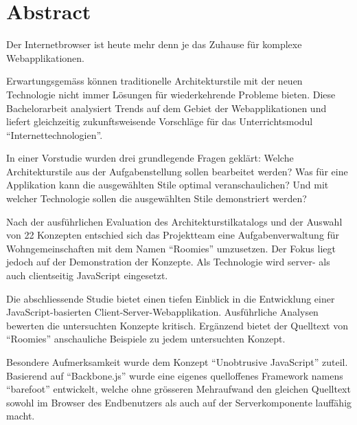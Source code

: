 \clearpage
\thispagestyle{empty}

\section*{Abstract}

Der Internetbrowser ist heute mehr denn je das Zuhause für komplexe Webapplikationen.

Erwartungsgemäss können traditionelle Architekturstile mit der neuen Technologie nicht immer Lösungen für wiederkehrende Probleme bieten. Diese Bachelorarbeit analysiert Trends auf dem Gebiet der Webapplikationen und liefert gleichzeitig zukunftsweisende Vorschläge für das Unterrichtsmodul ``Internettechnologien''.

In einer Vorstudie wurden drei grundlegende Fragen geklärt: Welche Architekturstile aus der Aufgabenstellung sollen bearbeitet werden? Was für eine Applikation kann die ausgewählten Stile optimal veranschaulichen? Und mit welcher Technologie sollen die ausgewählten Stile demonstriert werden?

Nach der ausführlichen Evaluation des Architekturstilkatalogs und der Auswahl von 22 Konzepten entschied sich das Projektteam eine Aufgabenverwaltung für Wohngemeinschaften mit dem Namen ``Roomies'' umzusetzen. Der Fokus liegt jedoch auf der Demonstration der Konzepte. Als Technologie wird server- als auch clientseitig JavaScript eingesetzt.

Die abschliessende Studie bietet einen tiefen Einblick in die Entwicklung einer JavaScript-basierten Client-Server-Webapplikation. Ausführliche Analysen bewerten die untersuchten Konzepte kritisch. Ergänzend bietet der Quelltext von ``Roomies'' anschauliche Beispiele zu jedem untersuchten Konzept.

Besondere Aufmerksamkeit wurde dem Konzept ``Unobtrusive JavaScript'' zuteil. Basierend auf ``Backbone.js'' wurde eine eigenes quelloffenes Framework namens ``barefoot'' entwickelt, welche ohne grösseren Mehraufwand den gleichen Quelltext sowohl im Browser des Endbenutzers als auch auf der Serverkomponente lauffähig macht.

\clearpage